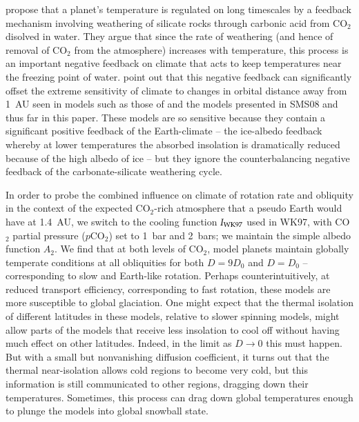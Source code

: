 \citet{walker_et_al1981} propose that a planet's temperature is
regulated on long timescales by a feedback mechanism involving
weathering of silicate rocks through carbonic acid from CO$_2$
disolved in water.  They argue that since the rate of weathering (and
hence of removal of CO$_2$ from the atmosphere) increases with
temperature, this process is an important negative feedback on climate
that acts to keep temperatures near the freezing point of water.
\citet{kasting_et_al1993} point out that this negative feedback can
significantly offset the extreme sensitivity of climate to changes in
orbital distance away from 1~AU seen in models such as those of
\citet{hart1979} and the models presented in SMS08 and thus far in
this paper.  These models are so sensitive because they contain a
significant positive feedback of the Earth-climate -- the ice-albedo
feedback whereby at lower temperatures the absorbed insolation is
dramatically reduced because of the high albedo of ice -- but they
ignore the counterbalancing negative feedback of the
carbonate-silicate weathering cycle.

In order to probe the combined influence on climate of rotation rate
and obliquity in the context of the expected CO$_2$-rich atmosphere
that a pseudo Earth would have at 1.4~AU, we switch to the cooling
function $I_{\rm WK97}$ used in WK97, with CO$_2$ partial pressure
($p$CO$_2$) set to 1~bar and 2~bars; we maintain the simple albedo
function $A_2$.  We find that at both levels of CO$_2$, model planets
maintain globally temperate conditions at all obliquities for both
$D=9D_0$ and $D=D_0$ -- corresponding to slow and Earth-like rotation.
Perhaps counterintuitively, at reduced transport efficiency,
corresponding to fast rotation, these models are more susceptible to
global glaciation.  One might expect that the thermal isolation of
different latitudes in these models, relative to slower spinning
models, might allow parts of the models that receive less insolation
to cool off without having much effect on other latitudes.  Indeed, in
the limit as $D\rightarrow 0$ this must happen.  But with a small but
nonvanishing diffusion coefficient, it turns out that the thermal
near-isolation allows cold regions to become very cold, but this
information is still communicated to other regions, dragging down
their temperatures.  Sometimes, this process can drag down global
temperatures enough to plunge the models into global snowball state.

